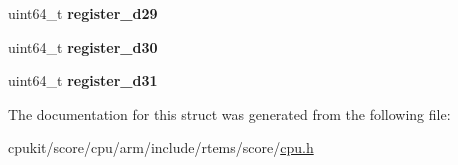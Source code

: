 \begin{DoxyCompactItemize}
\mbox{\label{structARM__VFP__context_a18443af7f11cb505769a2909c02db7f8}} 
uint64\+\_\+t {\bfseries register\+\_\+d29}
\item 
\mbox{\label{structARM__VFP__context_a666f85cc14fbde67580645b0e364b624}} 
uint64\+\_\+t {\bfseries register\+\_\+d30}
\item 
\mbox{\label{structARM__VFP__context_a5901c6b0e88c718cd9d5ddff5a17008a}} 
uint64\+\_\+t {\bfseries register\+\_\+d31}
\end{DoxyCompactItemize}


The documentation for this struct was generated from the following file\+:\begin{DoxyCompactItemize}
\item 
cpukit/score/cpu/arm/include/rtems/score/\mbox{\hyperlink{arm_2include_2rtems_2score_2cpu_8h}{cpu.\+h}}\end{DoxyCompactItemize}
